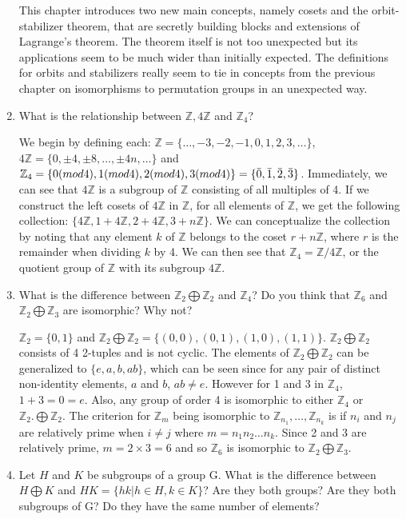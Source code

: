 \documentclass{article}
\newcommand{\Z}{\mathbb Z}
\begin{document}
\begin{enumerate}
    \begin{flushleft}
    This chapter introduces two new main concepts, namely cosets and the orbit-stabilizer theorem, that are secretly building blocks and extensions of Lagrange's theorem. The theorem itself is not too unexpected but its applications seem to be much wider than initially expected. The definitions for orbits and stabilizers really seem to tie in concepts from the previous chapter on isomorphisms to permutation groups in an unexpected way.
    \end{flushleft}
    \item What is the relationship between $\Z, 4\Z$ and $\Z_4$?
    \begin{flushleft}
    We begin by defining each: $\Z = \{ \ldots, -3, -2, -1, 0, 1, 2, 3, \ldots \}$, $4\Z = \{ 0, \pm4, \pm8, \ldots, \pm4n, \ldots \}$ and $\Z_4 = \{ 0 (mod 4), 1 (mod 4), 2 (mod 4), 3 (mod 4)\} = \{ \Bar{0}, \Bar{1}, \Bar{2}, \Bar{3} \}$. Immediately, we can see that $4\Z$ is a subgroup of $\Z$ consisting of all multiples of 4. If we construct the left cosets of $4\Z$ in $\Z$, for all elements of $\Z$, we get the following collection: $\{ 4\Z , 1 + 4 \Z, 2 + 4\Z, 3 + n\Z \}$. We can conceptualize the collection by noting that any element $k$ of $\Z$ belongs to the coset $r + n\Z$, where $r$ is the remainder when dividing $k$ by 4. We can then see that $\Z_4 = \Z/4\Z$, or the quotient group of $\Z$ with its subgroup $4\Z$.
    \end{flushleft}
    \item What is the difference between $\Z_2 \bigoplus \Z_2$ and $\Z_4$? Do you think that $\Z_6$ and $\Z_2 \bigoplus \Z_3$ are isomorphic? Why not?
    \begin{flushleft}
    $\Z_2 = \{ 0, 1 \}$ and $\Z_2 \bigoplus \Z_2 = \{ (0,0), (0, 1), (1, 0), (1, 1) \}$. $\Z_2 \bigoplus \Z_2$ consists of 4 2-tuples and is not cyclic. The elements of $\Z_2 \bigoplus \Z_2$ can be generalized to $\{ e, a, b, ab \}$, which can be seen since for any pair of distinct non-identity elements, $a$ and $b$, $ab \not= e$. However for 1 and 3 in $\Z_4$, $1 + 3 = 0 = e$. Also, any group of order 4 is isomorphic to either $\Z_4$ or $\Z_2. \bigoplus \Z_2$. The criterion for $\Z_m$ being isomorphic to $\Z_{n_1}, \ldots, \Z_{n_k}$ is if $n_i$ and $n_j$ are relatively prime when $i \not= j$ where $m = n_1n_2\ldots n_k$. Since 2 and 3 are relatively prime, $m = 2\times3 = 6$ and so $\Z_6$ is isomorphic to $\Z_2 \bigoplus \Z_3$.
    \end{flushleft}
    \item Let $H$ and $K$ be subgroups of a group G. What is the difference between $H \bigoplus K$ and $HK = \{hk | h \in H, k \in K\}$? Are they both groups? Are they both subgroups of G? Do they have the same number of elements?

\end{enumerate}
\end{document}
